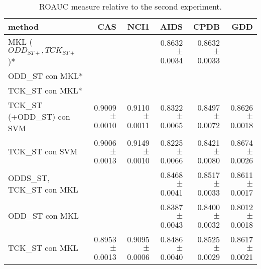 \begin{landscape}
\begin{table}[ht]
        \centering
        \begin{tabular}{|l|r|r|r|r|r|}
            \hline
            method&CAS&NCI1&AIDS&CPDB&GDD\\
            \hline
            MKL ($ODD_{ST+}, TCK_{ST+}$)*&&&0.8632 $\pm$ 0.0034&0.8632 $\pm$ 0.0033&\\
            \hline
            ODD\_ST con MKL*&&&&&\\
            \hline
            TCK\_ST con MKL*&&&&&\\
            \hline
            TCK\_ST (+ODD\_ST) con SVM&0.9009 $\pm$ 0.0010&0.9110 $\pm$ 0.0011&0.8322 $\pm$ 0.0065&0.8497 $\pm$ 0.0072&0.8626 $\pm$ 0.0018\\
            \hline
            TCK\_ST con SVM&0.9006 $\pm$ 0.0013&0.9149 $\pm$ 0.0010&0.8225 $\pm$ 0.0066&0.8421 $\pm$ 0.0080&0.8674 $\pm$ 0.0026\\
            \hline
            ODDS\_ST, TCK\_ST con MKL&&&0.8468 $\pm$ 0.0041&0.8517 $\pm$ 0.0033&0.8611 $\pm$ 0.0017\\
            \hline
            ODD\_ST con MKL&&&0.8387 $\pm$ 0.0043&0.8400 $\pm$ 0.0032&0.8012$\pm$ 0.0018\\
            \hline
            TCK\_ST con MKL&0.8953 $\pm$ 0.0013&0.9095 $\pm$ 0.0006&0.8486 $\pm$ 0.0040&0.8525 $\pm$ 0.0029&0.8617 $\pm$ 0.0021\\
            \hline
        \end{tabular}
        \label{table:results_stp}
        \caption{ROAUC measure relative to the second experiment. }
    \end{table}


\end{landscape}
